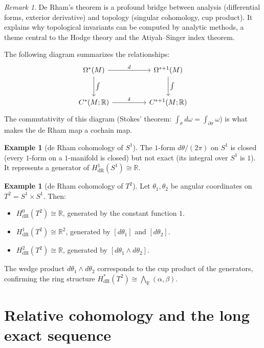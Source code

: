 \documentclass[12pt,a4paper,openany]{book}
\theoremstyle{definition}
\newtheorem{example}[definition]{Example}
\theoremstyle{plain}
\theoremstyle{remark}
\newtheorem{remark}[definition]{Remark}
\newcommand{\R}{\mathbb{R}}
\begin{document}
\begin{remark}
De Rham's theorem is a profound bridge between analysis (differential
forms, exterior derivative) and topology (singular cohomology, cup
product). It explains why topological invariants can be computed by
analytic methods, a theme central to the Hodge theory and the
Atiyah--Singer index theorem.
\end{remark}

The following diagram summarizes the relationships:
\[
\begin{tikzcd}[column sep=huge, row sep=large]
  \Omega^*(M) \ar[r,"d"] \ar[d,"\int"]
    & \Omega^{*+1}(M) \ar[d,"\int"]\\
  C^*(M;\R) \ar[r,"\delta"]
    & C^{*+1}(M;\R)
\end{tikzcd}
\]
The commutativity of this diagram (Stokes' theorem:
$\int_\sigma d\omega = \int_{\partial\sigma}\omega$)
is what makes the de Rham map a cochain map.

\begin{example}[de Rham cohomology of $S^1$]
The $1$-form $d\theta/(2\pi)$ on $S^1$ is closed (every $1$-form on
a $1$-manifold is closed) but not exact (its integral over $S^1$ is $1$).
It represents a generator of $H^1_{\mathrm{dR}}(S^1)\cong\R$.
\end{example}

\begin{example}[de Rham cohomology of $T^2$]
Let $\theta_1,\theta_2$ be angular coordinates on $T^2=S^1\times S^1$.
Then:
\begin{itemize}
  \item $H^0_{\mathrm{dR}}(T^2)\cong\R$, generated by the constant
    function $1$.
  \item $H^1_{\mathrm{dR}}(T^2)\cong\R^2$, generated by
    $[d\theta_1]$ and $[d\theta_2]$.
  \item $H^2_{\mathrm{dR}}(T^2)\cong\R$, generated by
    $[d\theta_1\wedge d\theta_2]$.
\end{itemize}
The wedge product $d\theta_1\wedge d\theta_2$ corresponds to the cup
product of the generators, confirming the ring structure
$H^*_{\mathrm{dR}}(T^2)\cong\bigwedge_\R(\alpha,\beta)$.
\end{example}

\section{Relative cohomology and the long exact sequence}
\label{sec:relative-cohomology}
\end{document}
